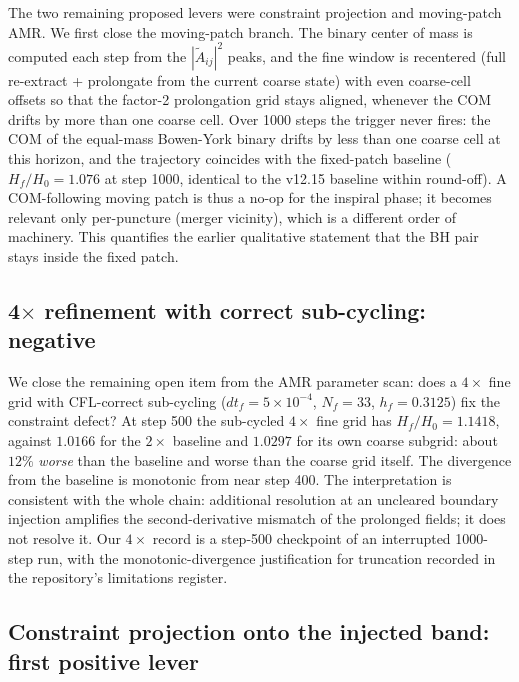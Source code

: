 The two remaining proposed levers were constraint projection and
moving-patch AMR. We first close the moving-patch branch. The binary
center of mass is computed each step from the $|\tilde A_{ij}|^2$
peaks, and the fine window is recentered (full re-extract +
prolongate from the current coarse state) with even coarse-cell
offsets so that the factor-2 prolongation grid stays aligned,
whenever the COM drifts by more than one coarse cell. Over 1000
steps the trigger never fires: the COM of the equal-mass Bowen-York
binary drifts by less than one coarse cell at this horizon, and the
trajectory coincides with the fixed-patch baseline ($H_f/H_0 = 1.076$
at step 1000, identical to the v12.15 baseline within round-off). A
COM-following moving patch is thus a no-op for the inspiral phase;
it becomes relevant only per-puncture (merger vicinity), which is a
different order of machinery. This quantifies the earlier
qualitative statement that the BH pair stays inside the fixed patch.

\subsection{4$\times$ refinement with correct sub-cycling: negative}

We close the remaining open item from the AMR parameter scan: does a
$4\times$ fine grid with CFL-correct sub-cycling ($dt_f = 5\times
10^{-4}$, $N_f = 33$, $h_f = 0.3125$) fix the constraint defect? At
step 500 the sub-cycled $4\times$ fine grid has $H_f/H_0 = 1.1418$,
against $1.0166$ for the $2\times$ baseline and $1.0297$ for its own
coarse subgrid: about $12\%$ \emph{worse} than the baseline and worse
than the coarse grid itself. The divergence from the baseline is
monotonic from near step 400. The interpretation is consistent with
the whole chain: additional resolution at an uncleared boundary
injection amplifies the second-derivative mismatch of the prolonged
fields; it does not resolve it. Our $4\times$ record is a step-500
checkpoint of an interrupted 1000-step run, with the
monotonic-divergence justification for truncation recorded in the
repository's limitations register.

\subsection{Constraint projection onto the injected band: first
positive lever}

